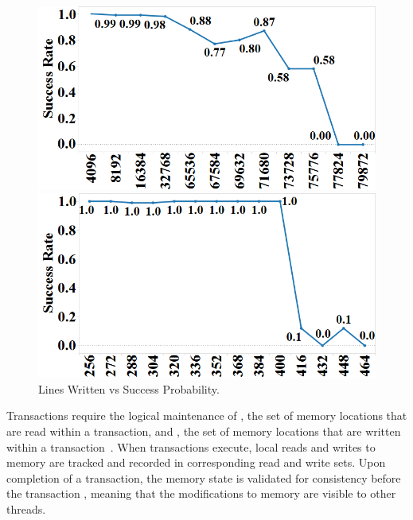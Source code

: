 \begin{figure}[h]%
\centering
\begin{minipage}[b]{.45\linewidth}
\centering
\includegraphics[width=\linewidth]{images/wttm_capacity_read_intel}
\caption{Lines Read vs Success Probability. 
}
\label{fig:wttm_capacity_read_intel}
\end{minipage}%
\quad
\begin{minipage}[b]{.45\linewidth}
\centering
\includegraphics[width=\linewidth]{images/wttm_capacity_write_intel}
\caption{Lines Written vs Success Probability. 
}
\label{fig:wttm_capacity_write_intel}
\end{minipage}
\end{figure}

Transactions require the logical 
maintenance of , the set
of memory locations that are read within a 
transaction, and , the set
of memory locations that are written within 
a transaction~\cite{HerlihyMo93}. When transactions execute, 
local reads and writes to memory 
are tracked and recorded in
corresponding read and write sets. Upon 
completion of a transaction, the memory state is validated for 
consistency before the transaction
, meaning that the modifications to 
memory are visible to other threads.


